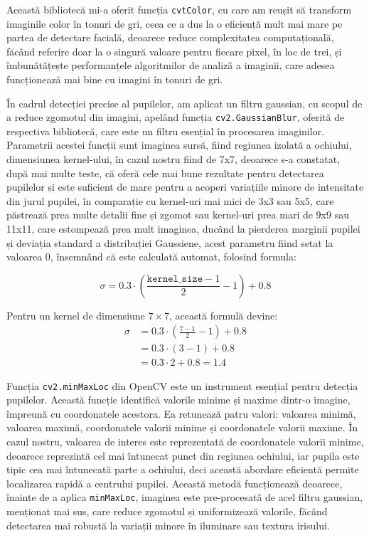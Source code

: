 \documentclass[12pt,a4paper]{article}
\begin{document}
Această bibliotecă mi-a oferit funcția \texttt{cvtColor}, cu care am reușit să
transform imaginile color în tonuri de gri, ceea ce a dus la o eficiență
mult mai mare pe partea de detectare facială, deoarece reduce
complexitatea computațională, făcând referire doar la o singură valoare
pentru fiecare pixel, în loc de trei, și îmbunătățește performanțele
algoritmilor de analiză a imaginii, care adesea funcționează mai bine cu
imagini în tonuri de gri.

În cadrul detecției precise al pupilelor, am aplicat un filtru gaussian,
cu scopul de a reduce zgomotul din imagini, apelând funcția
\texttt{cv2.GaussianBlur}, oferită de respectiva bibliotecă, care este un filtru
esențial în procesarea imaginilor. Parametrii acestei funcții sunt
imaginea sursă, fiind regiunea izolată a ochiului, dimensiunea
kernel-ului, în cazul nostru fiind de 7x7, deoarece s-a constatat, după
mai multe teste, că oferă cele mai bune rezultate pentru detectarea
pupilelor și este suficient de mare pentru a acoperi variațiile minore
de intensitate din jurul pupilei, în comparație cu kernel-uri mai mici
de 3x3 sau 5x5, care păstrează prea multe detalii fine și zgomot sau
kernel-uri prea mari de 9x9 sau 11x11, care estompează prea mult
imaginea, ducând la pierderea marginii pupilei și deviația standard a
distribuției Gaussiene, acest parametru fiind setat la valoarea 0,
însemnând că este calculată automat, folosind formula:

\begin{equation}
\sigma = 0.3 \cdot \left( \frac{\texttt{kernel\_size} - 1}{2} - 1 \right) + 0.8
\end{equation}

Pentru un kernel de dimensiune \(7 \times 7\), această formulă devine:
\begin{align}
\sigma &= 0.3 \cdot \left( \frac{7 - 1}{2} - 1 \right) + 0.8 \nonumber \\
    &= 0.3 \cdot (3 - 1) + 0.8 \nonumber \\
    &= 0.3 \cdot 2 + 0.8 \nonumber = 1.4
\end{align}

Funcția \texttt{cv2.minMaxLoc} din OpenCV este un instrument esențial pentru
detecția pupilelor. Această funcție identifică valorile minime și maxime
dintr-o imagine, împreună cu coordonatele acestora. Ea retunează patru
valori: valoarea minimă, valoarea maximă, coordonatele valorii minime și
coordonatele valorii maxime. În cazul nostru, valoarea de interes este
reprezentată de coordonatele valorii minime, deoarece reprezintă cel mai
întunecat punct din regiunea ochiului, iar pupila este tipic cea mai
întunecată parte a ochiului, deci această abordare eficientă permite
localizarea rapidă a centrului pupilei. Această metodă funcționează
deoarece, înainte de a aplica \texttt{minMaxLoc}, imaginea este pre-procesată de
acel filtru gaussian, menționat mai sus, care reduce zgomotul și
uniformizează valorile, făcând detectarea mai robustă la variații minore
în iluminare sau textura irisului.
\end{document}
